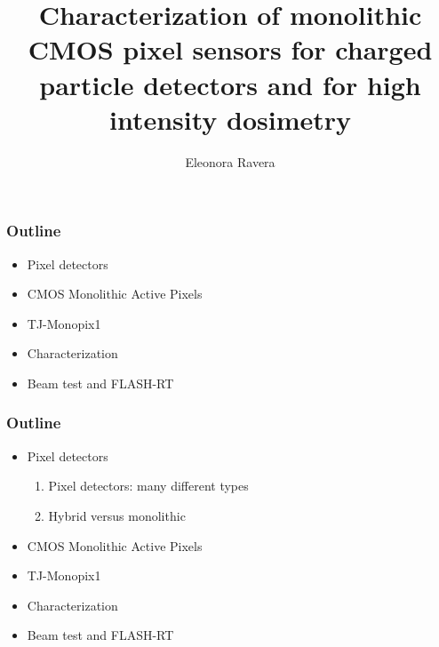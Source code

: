 \documentclass{beamer}
\title[]{Characterization of monolithic CMOS pixel sensors for charged particle detectors and for high intensity dosimetry}
\institute{Università degli studi di Pisa}
\author[Eleonora Ravera]{Eleonora Ravera}
\begin{document}
	 
\begin{frame}
\setTitlestyleDissertation
\maketitle
\end{frame}

\usetikzlibrary{decorations.pathreplacing}        


\begin{frame}[noframenumbering]
    \frametitle{Outline}
    \begin{itemize}
        \item Pixel detectors 
        \item CMOS Monolithic Active Pixels 
        \item TJ-Monopix1
        \item Characterization 
        \item Beam test and FLASH-RT
    \end{itemize}
\end{frame}

\begin{frame}[noframenumbering]
    \frametitle{Outline}
    \begin{itemize}
        \item <alert@1> Pixel detectors 
        \begin{enumerate}
            \item Pixel detectors: many different types
            \item Hybrid versus monolithic
        \end{enumerate}
        \item CMOS Monolithic Active Pixels 
        \item TJ-Monopix1
        \item Characterization 
        \item Beam test and FLASH-RT
    \end{itemize}
\end{frame}


\end{document}
